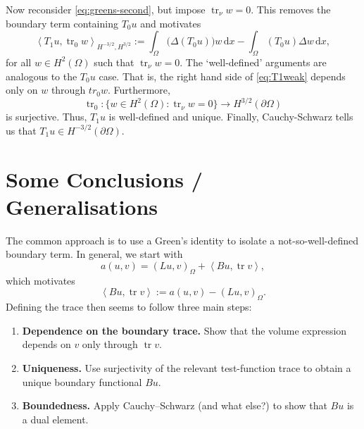 \documentclass[11pt,a4paper]{article}
\newcommand{\Om}{\Omega}
\newcommand{\dd}{\,\mathrm{d}}
\newcommand{\tr}{\operatorname{tr}}
\newcommand{\dual}[2]{\left\langle #1,#2\right\rangle}
\begin{document}
Now reconsider \eqref{eq:greens-second}, but impose
$\tr_\nu w=0$. This removes the boundary term containing $T_0u$ and
motivates
\begin{equation}\label{eq:T1weak}
    \dual{T_1u}{\tr_0w}_{H^{-3/2},H^{3/2}}
      :=\int_\Om\bigl(\Delta(T_0u)\bigr)w\dd x
        -\int_\Om(T_0u)\Delta w\dd x,
\end{equation}
for all $w\in H^2(\Om)$ such that $\tr_\nu w=0.$
The `well-defined' arguments are analogous to the $T_0u$ case. That is, the right hand side of \eqref{eq:T1weak} depends only on $w$ through $tr_0w.$ Furthermore,
\[
    \tr_0:\{w\in H^2(\Om):\tr_\nu w=0\}
                     \longrightarrow H^{3/2}(\partial\Om)
\]
is surjective. Thus, $T_1u$ is well-defined and unique. Finally, Cauchy-Schwarz tells us that $T_1u\in H^{-3/2}(\partial\Om).$

\newpage

\section{Some Conclusions / Generalisations}

The common approach is to use a Green's identity to isolate a not-so-well-defined boundary
term. In general, we start with 
\[
    a(u,v)=(Lu,v)_\Om+\dual{Bu}{\tr v},
\]
which motivates
\begin{equation}
    \dual{Bu}{\tr v}:=a(u,v)-(Lu,v)_\Om.
\end{equation}
Defining the trace then seems to follow three main steps:
\begin{enumerate}
    \item \textbf{Dependence on the boundary trace.}
          Show that the volume expression depends on $v$ only through
          $\tr v.$
    \item \textbf{Uniqueness.}
          Use surjectivity of the relevant test-function trace to
          obtain a unique boundary functional $Bu$.
    \item \textbf{Boundedness.}
          Apply Cauchy--Schwarz (and what else?) to show that
          $Bu$ is a dual element.
\end{enumerate}
\end{document}
